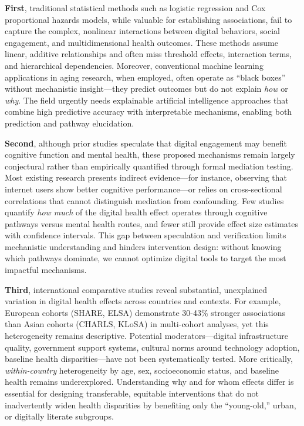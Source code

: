 \documentclass[10pt]{article}
\begin{document}
\textbf{First}, traditional statistical methods such as logistic regression and Cox proportional hazards models, while valuable for establishing associations, fail to capture the complex, nonlinear interactions between digital behaviors, social engagement, and multidimensional health outcomes. These methods assume linear, additive relationships and often miss threshold effects, interaction terms, and hierarchical dependencies. Moreover, conventional machine learning applications in aging research, when employed, often operate as ``black boxes'' without mechanistic insight---they predict outcomes but do not explain \textit{how} or \textit{why}. The field urgently needs explainable artificial intelligence approaches that combine high predictive accuracy with interpretable mechanisms, enabling both prediction and pathway elucidation.

\textbf{Second}, although prior studies speculate that digital engagement may benefit cognitive function and mental health, these proposed mechanisms remain largely conjectural rather than empirically quantified through formal mediation testing. Most existing research presents indirect evidence---for instance, observing that internet users show better cognitive performance---or relies on cross-sectional correlations that cannot distinguish mediation from confounding. Few studies quantify \textit{how much} of the digital health effect operates through cognitive pathways versus mental health routes, and fewer still provide effect size estimates with confidence intervals. This gap between speculation and verification limits mechanistic understanding and hinders intervention design: without knowing which pathways dominate, we cannot optimize digital tools to target the most impactful mechanisms.

\textbf{Third}, international comparative studies reveal substantial, unexplained variation in digital health effects across countries and contexts. For example, European cohorts (SHARE, ELSA) demonstrate 30-43\% stronger associations than Asian cohorts (CHARLS, KLoSA) in multi-cohort analyses, yet this heterogeneity remains descriptive. Potential moderators---digital infrastructure quality, government support systems, cultural norms around technology adoption, baseline health disparities---have not been systematically tested. More critically, \textit{within-country} heterogeneity by age, sex, socioeconomic status, and baseline health remains underexplored. Understanding why and for whom effects differ is essential for designing transferable, equitable interventions that do not inadvertently widen health disparities by benefiting only the ``young-old,'' urban, or digitally literate subgroups.
\end{document}
